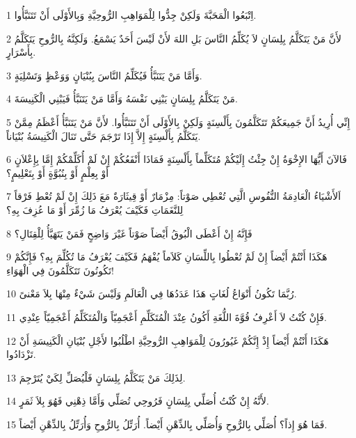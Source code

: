 \par 1 اِتْبَعُوا الْمَحَبَّةَ وَلَكِنْ جِدُّوا لِلْمَوَاهِبِ الرُّوحِيَّةِ وَبِالأَوْلَى أَنْ تَتَنَبَّأُوا.
\par 2 لأَنَّ مَنْ يَتَكَلَّمُ بِلِسَانٍ لاَ يُكَلِّمُ النَّاسَ بَلِ اللهَ لأَنْ لَيْسَ أَحَدٌ يَسْمَعُ. وَلَكِنَّهُ بِالرُّوحِ يَتَكَلَّمُ بِأَسْرَارٍ.
\par 3 وَأَمَّا مَنْ يَتَنَبَّأُ فَيُكَلِّمُ النَّاسَ بِبُنْيَانٍ وَوَعْظٍ وَتَسْلِيَةٍ.
\par 4 مَنْ يَتَكَلَّمُ بِلِسَانٍ يَبْنِي نَفْسَهُ وَأَمَّا مَنْ يَتَنَبَّأُ فَيَبْنِي الْكَنِيسَةَ.
\par 5 إِنِّي أُرِيدُ أَنَّ جَمِيعَكُمْ تَتَكَلَّمُونَ بِأَلْسِنَةٍ وَلَكِنْ بِالأَوْلَى أَنْ تَتَنَبَّأُوا. لأَنَّ مَنْ يَتَنَبَّأُ أَعْظَمُ مِمَّنْ يَتَكَلَّمُ بِأَلْسِنَةٍ إِلاَّ إِذَا تَرْجَمَ حَتَّى تَنَالَ الْكَنِيسَةُ بُنْيَاناً.
\par 6 فَالآنَ أَيُّهَا الإِخْوَةُ إِنْ جِئْتُ إِلَيْكُمْ مُتَكَلِّماً بِأَلْسِنَةٍ فَمَاذَا أَنْفَعُكُمْ إِنْ لَمْ أُكَلِّمْكُمْ إِمَّا بِإِعْلاَنٍ أَوْ بِعِلْمٍ أَوْ بِنُبُوَّةٍ أَوْ بِتَعْلِيمٍ؟
\par 7 اَلأَشْيَاءُ الْعَادِمَةُ النُّفُوسِ الَّتِي تُعْطِي صَوْتاً: مِزْمَارٌ أَوْ قِيثَارَةٌ مَعَ ذَلِكَ إِنْ لَمْ تُعْطِ فَرْقاً لِلنَّغَمَاتِ فَكَيْفَ يُعْرَفُ مَا زُمِّرَ أَوْ مَا عُزِفَ بِهِ؟
\par 8 فَإِنَّهُ إِنْ أَعْطَى الْبُوقُ أَيْضاً صَوْتاً غَيْرَ وَاضِحٍ فَمَنْ يَتَهَيَّأُ لِلْقِتَالِ؟
\par 9 هَكَذَا أَنْتُمْ أَيْضاً إِنْ لَمْ تُعْطُوا بِاللِّسَانِ كَلاَماً يُفْهَمُ فَكَيْفَ يُعْرَفُ مَا تُكُلِّمَ بِهِ؟ فَإِنَّكُمْ تَكُونُونَ تَتَكَلَّمُونَ فِي الْهَوَاءِ!
\par 10 رُبَّمَا تَكُونُ أَنْوَاعُ لُغَاتٍ هَذَا عَدَدُهَا فِي الْعَالَمِ وَلَيْسَ شَيْءٌ مِنْهَا بِلاَ مَعْنىً.
\par 11 فَإِنْ كُنْتُ لاَ أَعْرِفُ قُوَّةَ اللُّغَةِ أَكُونُ عِنْدَ الْمُتَكَلِّمِ أَعْجَمِيّاً وَالْمُتَكَلِّمُ أَعْجَمِيّاً عِنْدِي.
\par 12 هَكَذَا أَنْتُمْ أَيْضاً إِذْ إِنَّكُمْ غَيُورُونَ لِلْمَوَاهِبِ الرُّوحِيَّةِ اطْلُبُوا لأَجْلِ بُنْيَانِ الْكَنِيسَةِ أَنْ تَزْدَادُوا.
\par 13 لِذَلِكَ مَنْ يَتَكَلَّمُ بِلِسَانٍ فَلْيُصَلِّ لِكَيْ يُتَرْجِمَ.
\par 14 لأَنَّهُ إِنْ كُنْتُ أُصَلِّي بِلِسَانٍ فَرُوحِي تُصَلِّي وَأَمَّا ذِهْنِي فَهُوَ بِلاَ ثَمَرٍ.
\par 15 فَمَا هُوَ إِذاً؟ أُصَلِّي بِالرُّوحِ وَأُصَلِّي بِالذِّهْنِ أَيْضاً. أُرَتِّلُ بِالرُّوحِ وَأُرَتِّلُ بِالذِّهْنِ أَيْضاً.
